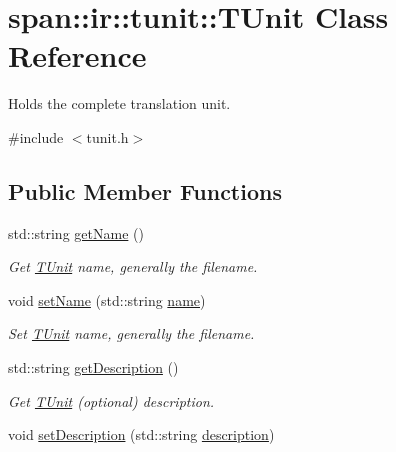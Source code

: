 \hypertarget{classspan_1_1ir_1_1tunit_1_1TUnit}{}\section{span\+:\+:ir\+:\+:tunit\+:\+:T\+Unit Class Reference}
\label{classspan_1_1ir_1_1tunit_1_1TUnit}


Holds the complete translation unit.  




{\ttfamily \#include $<$tunit.\+h$>$}

\subsection*{Public Member Functions}
\begin{DoxyCompactItemize}
\item 
std\+::string \hyperlink{classspan_1_1ir_1_1tunit_1_1TUnit_af45190bb51bff60767ba719482a80351}{get\+Name} ()
\begin{DoxyCompactList}\small\item\em Get \hyperlink{classspan_1_1ir_1_1tunit_1_1TUnit}{T\+Unit} name, generally the filename. \end{DoxyCompactList}\item 
void \hyperlink{classspan_1_1ir_1_1tunit_1_1TUnit_aafb230fac04e8d88606257223a21d198}{set\+Name} (std\+::string \hyperlink{classspan_1_1ir_1_1tunit_1_1TUnit_a85bc904e0f35d0548988e0b8b0cffa0c}{name})
\begin{DoxyCompactList}\small\item\em Set \hyperlink{classspan_1_1ir_1_1tunit_1_1TUnit}{T\+Unit} name, generally the filename. \end{DoxyCompactList}\item 
std\+::string \hyperlink{classspan_1_1ir_1_1tunit_1_1TUnit_ae80082eafb1c5ab45732473730d681a8}{get\+Description} ()
\begin{DoxyCompactList}\small\item\em Get \hyperlink{classspan_1_1ir_1_1tunit_1_1TUnit}{T\+Unit} (optional) description. \end{DoxyCompactList}\item 
void \hyperlink{classspan_1_1ir_1_1tunit_1_1TUnit_a74ebf1c50b498f8117a9fd9257ad501d}{set\+Description} (std\+::string \hyperlink{classspan_1_1ir_1_1tunit_1_1TUnit_a234d89befc589b46e7227e67738c023f}{description})
\end{DoxyCompactItemize}
